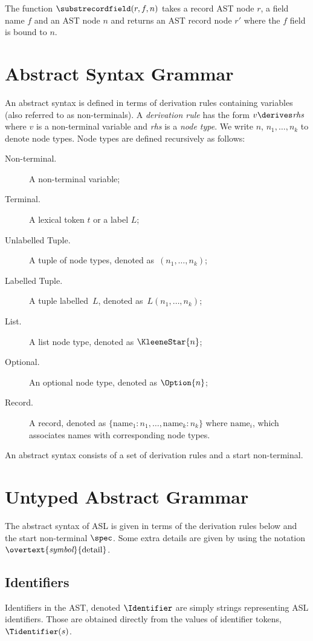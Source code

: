\hypertarget{def-substrecordfield}{}
The function $\substrecordfield(r, f, n)$ takes a record AST node $r$, a field name $f$ and an AST node $n$
and returns an AST record node $r'$ where the $f$ field is bound to $n$.

\section{Abstract Syntax Grammar\label{sec:AbstractSyntaxGrammar}}

An abstract syntax is defined in terms of derivation rules containing variables (also referred to as non-terminals).
%
A \emph{derivation rule} has the form $v \derives \textit{rhs}$ where $v$ is a non-terminal variable and \textit{rhs} is a \emph{node type}. We write $n$, $n_1,\ldots,n_k$ to denote node types.
%
Node types are defined recursively as follows:
\begin{description}
\item[Non-terminal.] A non-terminal variable;
\item[Terminal.] A lexical token $t$ or a label $L$;
\item[Unlabelled Tuple.] A tuple of node types, denoted as~$(n_1,\ldots,n_k)$;
\item[Labelled Tuple.] A tuple labelled~$L$, denoted as~$L(n_1,\ldots,n_k)$;
\item[List.] A list node type, denoted as $\KleeneStar{n}$;
\item[Optional.] An optional node type, denoted as $\Option{n}$;
\item[Record.] A record, denoted as $\{\text{name}_1 : n_1,\ldots,\text{name}_k : n_k\}$ where $\text{name}_i$, which associates names with corresponding node types.
\end{description}

\newpage

An abstract syntax consists of a set of derivation rules and a start non-terminal.

\section{Untyped Abstract Grammar\label{sec:UntypedAbstractGrammar}}

The abstract syntax of ASL is given in terms of the derivation rules below and the start non-terminal $\spec$.
%
Some extra details are given by using the notation $\overtext{\textit{symbol}}{\text{detail}}$.

\subsection{Identifiers \label{sec:Identifiers}}
Identifiers in the AST, denoted $\Identifier$ are simply strings representing ASL identifiers.
Those are obtained directly from the values of identifier tokens, $\Tidentifier(s)$.

